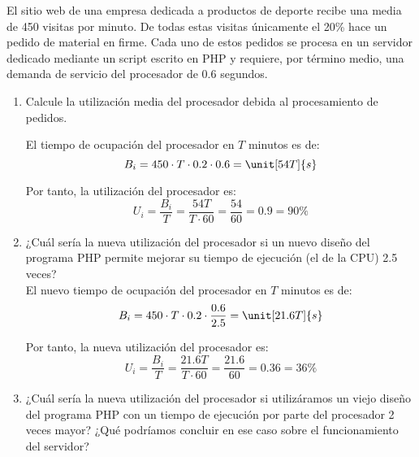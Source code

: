 \begin{comment}
\solucion
    \begin{enumerate}
        \item Respecto del subsistema de disco: el error es del $2.4\%$, la productividad es $0.68$ peticiones/segundo y la utilización $0.65$.
        \item Respecto del servidor: la productividad es $0.137$ peticiones/segundo y el tiempo medio de respuesta $95.1$ segundos.
    \end{enumerate}
\end{comment}

\begin{ejercicio}\label{ej:5.7}
    El sitio web de una empresa dedicada a productos de deporte recibe una media de 450 visitas por minuto. De todas estas visitas únicamente el 20\% hace un pedido de material en firme. Cada uno de estos pedidos se procesa en un servidor dedicado mediante un script escrito en PHP y requiere, por término medio, una demanda de servicio del procesador de $0.6$ segundos.
    \begin{enumerate}
        \item Calcule la utilización media del procesador debida al procesamiento de pedidos.
        
        El tiempo de ocupación del procesador en $T$ minutos es de:
        \begin{equation*}
            B_i = 450\cdot T\cdot 0.2 \cdot 0.6 = \unit[54T]{s}
        \end{equation*}

        Por tanto, la utilización del procesador es:
        \begin{equation*}
            U_i = \dfrac{B_i}{T} = \dfrac{54T}{T\cdot 60} = \dfrac{54}{60} = 0.9 = 90\%
        \end{equation*}
        \item ¿Cuál sería la nueva utilización del procesador si un nuevo diseño del programa PHP permite mejorar su tiempo de ejecución (el de la CPU) 2.5 veces?\\
        
        El nuevo tiempo de ocupación del procesador en $T$ minutos es de:
        \begin{equation*}
            B_i = 450\cdot T\cdot 0.2 \cdot \dfrac{0.6}{2.5} = \unit[21.6T]{s}
        \end{equation*}

        Por tanto, la nueva utilización del procesador es:
        \begin{equation*}
            U_i = \dfrac{B_i}{T} = \dfrac{21.6T}{T\cdot 60} = \dfrac{21.6}{60} = 0.36 = 36\%
        \end{equation*}
        \item ¿Cuál sería la nueva utilización del procesador si utilizáramos un viejo diseño del programa PHP con un tiempo de ejecución por parte del procesador 2 veces mayor? ¿Qué podríamos concluir en ese caso sobre el funcionamiento del servidor?\\
        

\end{enumerate}
\end{ejercicio}
